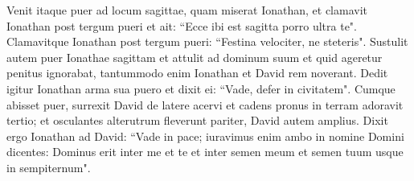 \begin{biblechapter}
\verse Venit itaque puer ad locum sagittae, quam miserat Ionathan, et clamavit Ionathan post tergum pueri et ait: “Ecce ibi est sagitta porro ultra te". 
\verse Clamavitque Ionathan post tergum pueri: “Festina velociter, ne steteris". Sustulit autem puer Ionathae sagittam et attulit ad dominum suum 
\verse et quid ageretur penitus ignorabat, tantummodo enim Ionathan et David rem noverant. 
\verse Dedit igitur Ionathan arma sua puero et dixit ei: “Vade, defer in civitatem". 
\verse Cumque abisset puer, surrexit David de latere acervi et cadens pronus in terram adoravit tertio; et osculantes alterutrum fleverunt pariter, David autem amplius. 
\verse Dixit ergo Ionathan ad David: “Vade in pace; iuravimus enim ambo in nomine Domini dicentes: Dominus erit inter me et te et inter semen meum et semen tuum usque in sempiternum". 
\end{biblechapter}

